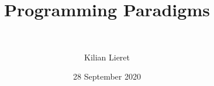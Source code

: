 %
\title{Programming Paradigms}
\subtitle{\ \relax}
\author{Kilian Lieret}
\newcommand*{\coauthors}{}
\date{28 September 2020}
%
%
%